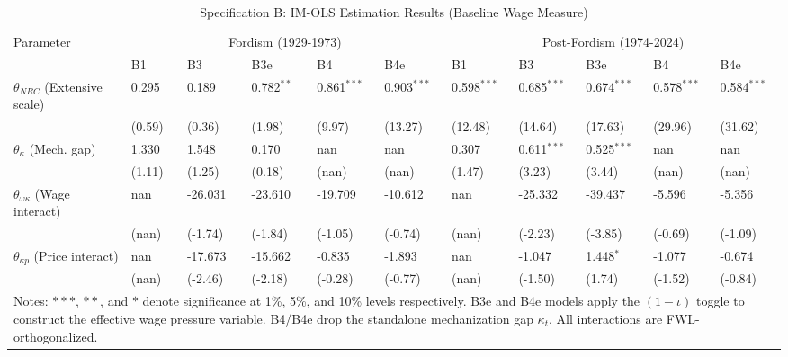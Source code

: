 \begin{table}[H]
\centering
\setlength{\tabcolsep}{2.5pt}
\caption{Specification B: IM-OLS Estimation Results (Baseline Wage Measure)}
\label{tab:specB_imols}
\scriptsize
\begin{tabular}{p{3.2cm}p{1.1cm}p{1.1cm}p{1.1cm}p{1.1cm}p{1.1cm}p{1.1cm}p{1.1cm}p{1.1cm}p{1.1cm}p{1.1cm}}
\toprule
Parameter & \multicolumn{5}{c}{Fordism (1929-1973)} & \multicolumn{5}{c}{Post-Fordism (1974-2024)} \\
\cmidrule(lr){2-6} \cmidrule(lr){7-11}
 & B1 & B3 & B3e & B4 & B4e & B1 & B3 & B3e & B4 & B4e \\
\midrule
$\theta_{NRC}$ (Extensive scale) & 0.295 & 0.189 & 0.782$^{**}$ & 0.861$^{***}$ & 0.903$^{***}$ & 0.598$^{***}$ & 0.685$^{***}$ & 0.674$^{***}$ & 0.578$^{***}$ & 0.584$^{***}$ \\
  & (0.59) & (0.36) & (1.98) & (9.97) & (13.27) & (12.48) & (14.64) & (17.63) & (29.96) & (31.62) \\
$\theta_{\kappa}$ (Mech. gap) & 1.330 & 1.548 & 0.170 & nan & nan & 0.307 & 0.611$^{***}$ & 0.525$^{***}$ & nan & nan \\
  & (1.11) & (1.25) & (0.18) & (nan) & (nan) & (1.47) & (3.23) & (3.44) & (nan) & (nan) \\
$\theta_{\omega\kappa}$ (Wage interact) & nan & -26.031 & -23.610 & -19.709 & -10.612 & nan & -25.332 & -39.437 & -5.596 & -5.356 \\
  & (nan) & (-1.74) & (-1.84) & (-1.05) & (-0.74) & (nan) & (-2.23) & (-3.85) & (-0.69) & (-1.09) \\
$\theta_{\kappa p}$ (Price interact) & nan & -17.673 & -15.662 & -0.835 & -1.893 & nan & -1.047 & 1.448$^{*}$ & -1.077 & -0.674 \\
  & (nan) & (-2.46) & (-2.18) & (-0.28) & (-0.77) & (nan) & (-1.50) & (1.74) & (-1.52) & (-0.84) \\
\bottomrule
\multicolumn{11}{p{15cm}}{\footnotesize Notes: $***$, $**$, and $*$ denote significance at 1\%, 5\%, and 10\% levels respectively. B3e and B4e models apply the $(1-\iota)$ toggle to construct the effective wage pressure variable. B4/B4e drop the standalone mechanization gap $\kappa_t$. All interactions are FWL-orthogonalized.}
\end{tabular}
\end{table}

